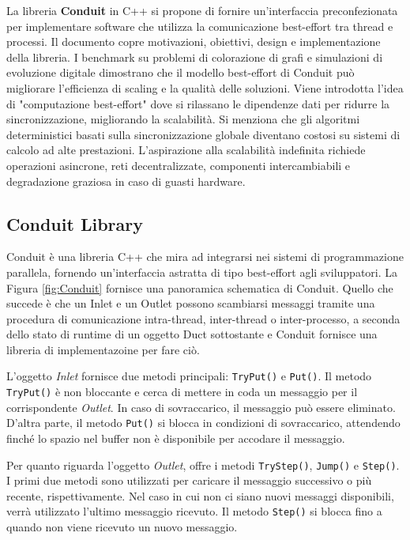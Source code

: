 \documentclass[11pt]{article}
\begin{document}
\begin{multicols*}{2}[\columnsep=1cm]
La libreria \textbf{Conduit} in C++ si propone di fornire un'interfaccia preconfezionata per implementare software che utilizza la comunicazione best-effort tra thread e processi. 
Il documento copre motivazioni, obiettivi, design e implementazione della libreria. I benchmark su problemi di colorazione di grafi e simulazioni di evoluzione digitale dimostrano che il modello best-effort di Conduit può migliorare l'efficienza di scaling e la qualità delle soluzioni.
Viene introdotta l'idea di "computazione best-effort" dove si rilassano le dipendenze dati per ridurre la sincronizzazione, migliorando la scalabilità. Si menziona che gli algoritmi deterministici basati sulla sincronizzazione globale diventano costosi su sistemi di calcolo ad alte prestazioni. L'aspirazione alla scalabilità indefinita richiede operazioni asincrone, reti decentralizzate, componenti intercambiabili e degradazione graziosa in caso di guasti hardware.

\subsection{Conduit Library}
Conduit è una libreria C++ che mira ad integrarsi nei sistemi di programmazione parallela, fornendo un'interfaccia astratta di tipo best-effort agli sviluppatori.
La Figura \ref{fig:Conduit} fornisce una panoramica schematica di Conduit.
Quello che succede è che un Inlet e un Outlet possono scambiarsi messaggi tramite una procedura di comunicazione intra-thread, inter-thread o inter-processo, a seconda dello stato di runtime di un oggetto Duct sottostante e Conduit fornisce una libreria di implementazoine per fare ciò.

L'oggetto \textit{Inlet} fornisce due metodi principali: \texttt{TryPut()} e \texttt{Put()}. Il metodo \texttt{TryPut()} è non bloccante e cerca di mettere in coda un messaggio per il corrispondente \textit{Outlet}. In caso di sovraccarico, il messaggio può essere eliminato. D'altra parte, il metodo \texttt{Put()} si blocca in condizioni di sovraccarico, attendendo finché lo spazio nel buffer non è disponibile per accodare il messaggio.

Per quanto riguarda l'oggetto \textit{Outlet}, offre i metodi \texttt{TryStep()}, \texttt{Jump()} e \texttt{Step()}. I primi due metodi sono utilizzati per caricare il messaggio successivo o più recente, rispettivamente. Nel caso in cui non ci siano nuovi messaggi disponibili, verrà utilizzato l'ultimo messaggio ricevuto. Il metodo \texttt{Step()} si blocca fino a quando non viene ricevuto un nuovo messaggio.


\end{multicols*}
\end{document}
